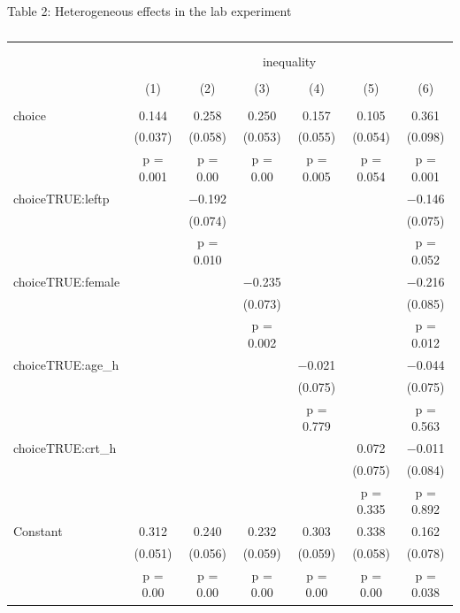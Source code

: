 \documentclass{beamer}
\begin{document}
\begin{frame}{Table 2: Heterogeneous effects in the lab experiment}
	
	\begin{block}\tiny
		\begin{table}[!htbp] \centering \tiny
	\caption{} 
	\label{tbl:l2} 
	\begin{tabular}{@{\extracolsep{4pt}}lcccccc} 
		\hline \\[-1.0ex] 
		\\[-1.0ex] & \multicolumn{6}{c}{inequality} \\ 
		\\[-1.0ex] & (1) & (2) & (3) & (4) & (5) & (6)\\ 
		\hline \\[-1.0ex] 
		choice & 0.144 & 0.258 & 0.250 & 0.157 & 0.105 & 0.361 \\ 
		& (0.037) & (0.058) & (0.053) & (0.055) & (0.054) & (0.098) \\ 
		& p = 0.001 & p = 0.00 & p = 0.00 & p = 0.005 & p = 0.054 & p = 0.001 \\ 
		choiceTRUE:leftp &  & $-$0.192 &  &  &  & $-$0.146 \\ 
		&  & (0.074) &  &  &  & (0.075) \\ 
		&  & p = 0.010 &  &  &  & p = 0.052 \\ 
		choiceTRUE:female &  &  & $-$0.235 &  &  & $-$0.216 \\ 
		&  &  & (0.073) &  &  & (0.085) \\ 
		&  &  & p = 0.002 &  &  & p = 0.012 \\ 
		choiceTRUE:age\_h &  &  &  & $-$0.021 &  & $-$0.044 \\ 
		&  &  &  & (0.075) &  & (0.075) \\ 
		&  &  &  & p = 0.779 &  & p = 0.563 \\ 
		choiceTRUE:crt\_h &  &  &  &  & 0.072 & $-$0.011 \\ 
		&  &  &  &  & (0.075) & (0.084) \\ 
		&  &  &  &  & p = 0.335 & p = 0.892 \\ 
		Constant & 0.312 & 0.240 & 0.232 & 0.303 & 0.338 & 0.162 \\ 
		& (0.051) & (0.056) & (0.059) & (0.059) & (0.058) & (0.078) \\ 
		& p = 0.00 & p = 0.00 & p = 0.00 & p = 0.00 & p = 0.00 & p = 0.038 \\ 

\end{tabular}
\end{table}
\end{block}
\end{frame}
\end{document}
